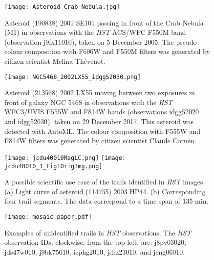 \documentclass{aa}
\begin{document}

\begin{figure}
   \centering
   \texttt{[image: Asteroid\_Crab\_Nebula.jpg]}
   \caption{Asteroid (190838) 2001 SE101 passing in front of the Crab Nebula (M1) in observations with the \textit{HST} ACS/WFC F550M band (observation j9fx11010), taken on 5 December 2005. The pseudo-colour composition with F606W and F550M filters was generated by citizen scientist Melina Th\'evenot.}
    \label{crab}%
\end{figure}

\begin{figure}
   \centering
   \texttt{[image: NGC5468\_2002LX55\_idgg52030.png]}
   \caption{Asteroid (213568) 2002 LX55 moving between two exposures in front of galaxy NGC 5468 in observations with the \textit{HST} WFC3/UVIS F555W and F814W bands (observations idgg52020 and idgg52030), taken on 29 December 2017. This asteroid was detected with AutoML. The colour composition with F555W and F814W filters was generated by citizen scientist Claude Cornen.}
    \label{2002LX55}%
\end{figure}

\begin{figure}
   \centering
   \texttt{[image: jcdu40010MagLC.png]}
   \texttt{[image: jcdu40010\_1\_Fig1OrigImg.png]}
   \caption{A possible scientific use case of the trails identified in \textit{HST} images. (a) Light curve of asteroid (114755) 2003 HP44. (b) Corresponding four trail segments.  The data correspond to a time span of 135 min. }
    \label{lightcurveexample}%
\end{figure}


\begin{figure*}
   \centering
   \texttt{[image: mosaic\_paper.pdf]}
   \caption{Examples of unidentified trails in \textit{HST} observations. The \textit{HST} observation IDs, clockwise, from the top left, are: j8pv03020, jds47w010, j9bk75010, icphg2010, jdrz23010, and jcng06010.}
    \label{unknown_asteroids}%
\end{figure*}
\end{document}
